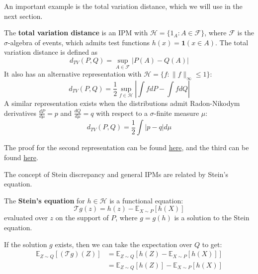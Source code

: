 \documentclass{article}
\begin{document}
An important example is the total variation distance, which we will use in the next section.  

\begin{example}
    The \textbf{total variation distance} is an IPM with $\mathcal{H}=\{1_A: A \in \mathcal{F}\}$, where $\mathcal{F}$ is the $\sigma$-algebra of events, which admits test functions $h(x) = \mathbf{1}(x\in A)$. The total variation distance is defined as  
    \begin{equation}
        d_{TV}(P, Q) = \sup_{A \in \mathcal{F}} |P(A) - Q(A)|
        \label{eq:total_variation_distance}
    \end{equation}
    It also has an alternative representation with $\mathcal{H} = \{f: \|f\|_\infty \leq 1\}$:
    \begin{equation*}
        d_{TV}(P, Q) = \frac{1}{2} \sup_{f \in \mathcal{H}}\left|\int f dP - \int f dQ\right|
    \end{equation*}
    A similar representation exists when the distributions admit Radon-Nikodym derivatives $\frac{dP}{d\mu}=p$ and $\frac{dQ}{d\mu}=q$ with respect to a $\sigma$-finite measure $\mu$:
    \begin{equation*}
        d_{TV}(P, Q) = \frac{1}{2} \int |p - q| d\mu
    \end{equation*}
\end{example}

The proof for the second representation can be found \href{https://math.stackexchange.com/questions/3287889/show-that-the-total-variation-distance-of-probability-measures-mu-nu-is-equa}{here}, and the third can be found \href{https://math.stackexchange.com/questions/1481101/definition-of-the-total-variation-distance-vp-q-frac12-int-p-qd-n}{here}.  

The concept of Stein discrepancy and general IPMs are related by Stein's equation.

\begin{definition}\label{def:stein_equation}
    The \textbf{Stein's equation} for $h\in \mathcal{H}$ is a functional equation:
    \begin{equation*}
        \mathcal{T}g (z) = h(z) - \mathbb{E}_{X\sim P}[h(X)]
    \end{equation*}
    evaluated over $z$ on the support of $P$, where $g=g(h)$ is a solution to the Stein equation.
\end{definition}

If the solution $g$ exists, then we can take the expectation over $Q$ to get:
\begin{align*}
    \mathbb{E}_{Z\sim Q}[(\mathcal{T}g)(Z)] &= \mathbb{E}_{Z\sim Q}[h(Z) - \mathbb{E}_{X\sim P}[h(X)]]\\
    &= \mathbb{E}_{Z\sim Q}[h(Z)] - \mathbb{E}_{X\sim P}[h(X)]
\end{align*}
\end{document}
